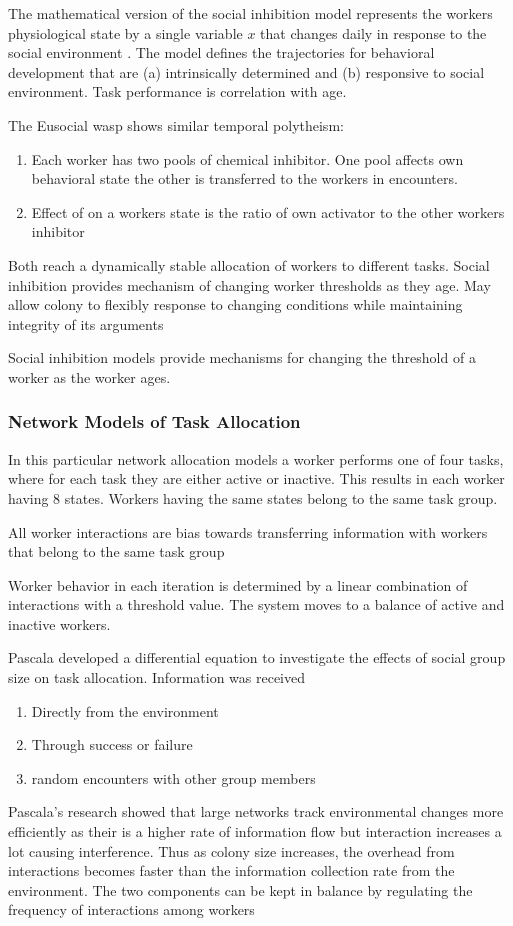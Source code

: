 The mathematical version of the social inhibition model represents the workers physiological state by a single variable $x$ that changes daily in response to the social environment \cite{beshers2001social}. The model defines the trajectories for behavioral development that are (a) intrinsically determined and (b) responsive to social environment. Task performance is correlation with age. 

The Eusocial wasp shows similar temporal polytheism:
\begin{enumerate}
	\item Each worker has two pools of chemical inhibitor. One pool affects own behavioral state the other is transferred to the workers in encounters. 
	\item Effect of  on a workers state is the ratio of own activator to the other workers inhibitor
\end{enumerate}

Both reach a dynamically stable allocation of workers to different tasks. Social inhibition provides mechanism of changing worker thresholds as they age. May allow colony to flexibly response to changing conditions while maintaining integrity of its arguments

Social inhibition models provide mechanisms for changing the threshold of a worker as the worker ages. 

\subsubsection{Network Models of Task Allocation}
In this particular network allocation models a worker performs one of four tasks, where for each task they are either active or inactive. This results in each worker having 8 states. Workers having the same states belong to the same task group.

All worker interactions are bias towards transferring information with workers that belong to the same task group \cite{gordon1992parallel}

Worker behavior in each iteration is determined by a linear combination of interactions with a threshold value. The system moves to a balance of active and inactive workers. 

Pascala \cite{pacala1996effects} developed a differential equation to investigate the effects of social group size on task allocation. Information was received
\begin{enumerate}
	\item Directly from the environment
	\item Through success or failure
	\item random encounters with other group members
\end{enumerate}
Pascala's research showed that large networks track environmental changes more efficiently as their is a higher rate of information flow but interaction increases a lot causing interference. Thus as colony size increases, the overhead from interactions becomes faster than the information collection rate from the environment. The two components can be kept in balance by regulating the frequency of interactions among workers \cite{pacala1996effects} %

